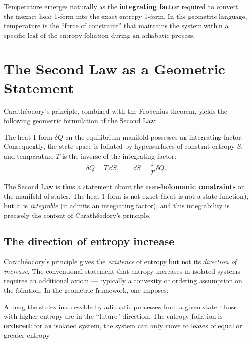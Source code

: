 Temperature emerges naturally as the \textbf{integrating factor} required to convert the inexact heat 1-form into the exact entropy 1-form. In the geometric language, temperature is the ``force of constraint'' that maintains the system within a specific leaf of the entropy foliation during an adiabatic process.

\section{The Second Law as a Geometric Statement}

Carath\'eodory's principle, combined with the Frobenius theorem, yields the following geometric formulation of the Second Law:

\begin{theorem}
The heat 1-form $\delta Q$ on the equilibrium manifold possesses an integrating factor. Consequently, the state space is foliated by hypersurfaces of constant entropy $S$, and temperature $T$ is the inverse of the integrating factor:
\begin{equation}
\delta Q = T\,\dd S, \qquad \dd S = \frac{1}{T}\,\delta Q.
\end{equation}
\end{theorem}

The Second Law is thus a statement about the \textbf{non-holonomic constraints} on the manifold of states. The heat 1-form is not exact (heat is not a state function), but it is \emph{integrable} (it admits an integrating factor), and this integrability is precisely the content of Carath\'eodory's principle.

\subsection{The direction of entropy increase}

Carath\'eodory's principle gives the \emph{existence} of entropy but not its \emph{direction of increase}. The conventional statement that entropy increases in isolated systems requires an additional axiom --- typically a convexity or ordering assumption on the foliation. In the geometric framework, one imposes:

\begin{definition}
Among the states inaccessible by adiabatic processes from a given state, those with higher entropy are in the ``future'' direction. The entropy foliation is \textbf{ordered}: for an isolated system, the system can only move to leaves of equal or greater entropy.
\end{definition}

